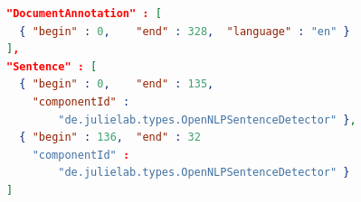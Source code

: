 \documentclass{article}
\begin{document}

\begin{lstlisting}[float,language=json,
                   caption=Excerpt of JSON output for sentence detection,
                   label=lst:json_sententence_detection]
"DocumentAnnotation" : [
  { "begin" : 0,    "end" : 328,  "language" : "en" }
],
"Sentence" : [
  { "begin" : 0,    "end" : 135,
    "componentId" :
        "de.julielab.types.OpenNLPSentenceDetector" },
  { "begin" : 136,  "end" : 32
    "componentId" :
        "de.julielab.types.OpenNLPSentenceDetector" }
]
\end{lstlisting}
\end{document}
